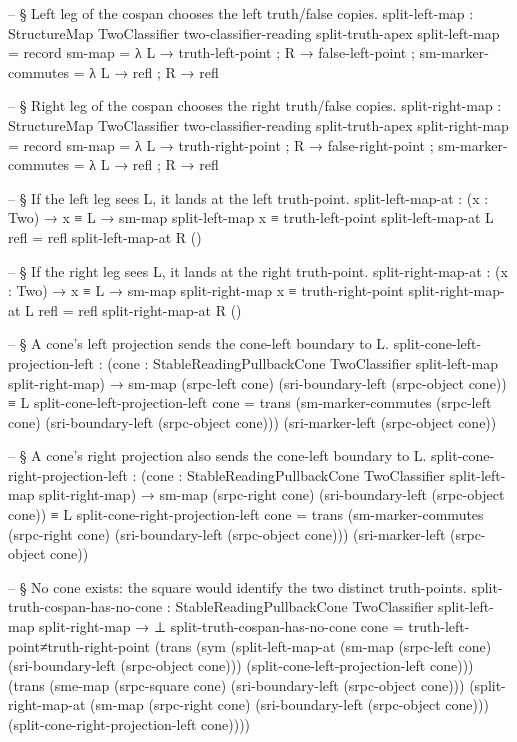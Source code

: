 \documentclass[11pt]{article}
\begin{document}
\begin{code}
-- § Left leg of the cospan chooses the left truth/false copies.
split-left-map :
  StructureMap TwoClassifier two-classifier-reading split-truth-apex
split-left-map = record
  { sm-map = λ
      { L → truth-left-point
      ; R → false-left-point
      }
  ; sm-marker-commutes = λ
      { L → refl
      ; R → refl
      }
  }

-- § Right leg of the cospan chooses the right truth/false copies.
split-right-map :
  StructureMap TwoClassifier two-classifier-reading split-truth-apex
split-right-map = record
  { sm-map = λ
      { L → truth-right-point
      ; R → false-right-point
      }
  ; sm-marker-commutes = λ
      { L → refl
      ; R → refl
      }
  }

-- § If the left leg sees L, it lands at the left truth-point.
split-left-map-at :
  (x : Two) → x ≡ L → sm-map split-left-map x ≡ truth-left-point
split-left-map-at L refl = refl
split-left-map-at R ()

-- § If the right leg sees L, it lands at the right truth-point.
split-right-map-at :
  (x : Two) → x ≡ L → sm-map split-right-map x ≡ truth-right-point
split-right-map-at L refl = refl
split-right-map-at R ()

-- § A cone's left projection sends the cone-left boundary to L.
split-cone-left-projection-left :
  (cone : StableReadingPullbackCone TwoClassifier split-left-map split-right-map) →
  sm-map (srpc-left cone) (sri-boundary-left (srpc-object cone)) ≡ L
split-cone-left-projection-left cone =
  trans
    (sm-marker-commutes
      (srpc-left cone)
      (sri-boundary-left (srpc-object cone)))
    (sri-marker-left (srpc-object cone))

-- § A cone's right projection also sends the cone-left boundary to L.
split-cone-right-projection-left :
  (cone : StableReadingPullbackCone TwoClassifier split-left-map split-right-map) →
  sm-map (srpc-right cone) (sri-boundary-left (srpc-object cone)) ≡ L
split-cone-right-projection-left cone =
  trans
    (sm-marker-commutes
      (srpc-right cone)
      (sri-boundary-left (srpc-object cone)))
    (sri-marker-left (srpc-object cone))

-- § No cone exists: the square would identify the two distinct truth-points.
split-truth-cospan-has-no-cone :
  StableReadingPullbackCone TwoClassifier split-left-map split-right-map → ⊥
split-truth-cospan-has-no-cone cone =
  truth-left-point≠truth-right-point
    (trans
      (sym
        (split-left-map-at
          (sm-map (srpc-left cone) (sri-boundary-left (srpc-object cone)))
          (split-cone-left-projection-left cone)))
      (trans
        (sme-map (srpc-square cone) (sri-boundary-left (srpc-object cone)))
        (split-right-map-at
          (sm-map (srpc-right cone) (sri-boundary-left (srpc-object cone)))
          (split-cone-right-projection-left cone))))
\end{code}
\end{document}
